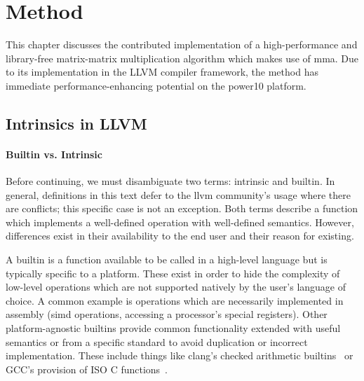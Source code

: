 \documentclass[\main/thesis.tex]{subfiles}
\begin{document}
\chapter{Method}
\label{cha:method}
This chapter discusses the contributed implementation of a high-performance and library-free matrix-matrix multiplication algorithm which makes use of \gls{mma}.
Due to its implementation in the LLVM compiler framework, the method has immediate performance-enhancing potential on the \gls{power10} platform.

\section{Intrinsics in LLVM}

\subsubsection{Builtin vs. Intrinsic}
Before continuing, we must disambiguate two terms: \gls{intrinsic} and \gls{builtin}.
In general, definitions in this text defer to the \gls{llvm} community's usage where there are conflicts; this specific case is not an exception.
Both terms describe a function which implements a well-defined operation with well-defined semantics.
However, differences exist in their availability to the end user and their reason for existing.

A \gls{builtin} is a function available to be called in a high-level language but is typically specific to a platform.
These exist in order to hide the complexity of low-level operations which are not supported natively by the user's language of choice.
A common example is operations which are necessarily implemented in assembly (\eg \gls{simd} operations, accessing a processor's special registers).
Other platform-agnostic \glspl{builtin} provide common functionality extended with useful semantics or from a specific standard to avoid duplication or incorrect implementation.
These include things like \gls{clang}'s checked arithmetic builtins~\autocite{llvmCheckArith} or GCC's provision of ISO C functions~\autocite{gccOtherBuiltins}.
\end{document}
